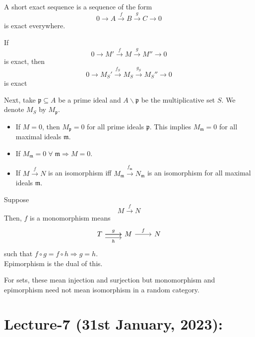 \documentclass[oneside, 12pt, ]{scrbook}
\newcommand{\pr}{\mathfrak{p}}
\newcommand{\m}{\mathfrak{m}}
\theoremstyle{theorem}
\begin{document}
\begin{definition}
A short exact sequence is a sequence of the form $$0 \rightarrow A \xrightarrow{f} B \xrightarrow{g} C \rightarrow 0$$ is exact everywhere.
\end{definition}

\begin{proposition}
If  $$0 \rightarrow M' \xrightarrow{f} M \xrightarrow{g} M'' \rightarrow 0$$ is exact, then $$0 \rightarrow M_{S}' \xrightarrow{f_{S}} M_{S} \xrightarrow{g_{S}} M_{S}'' \rightarrow 0$$ is exact
\end{proposition}

Next, take $\pr \subseteq A$ be a prime ideal and $A\backslash \pr$ be the multiplicative set $S$. We denote $M_{S}$ by $M_{\pr}$.
\begin{itemize}
\item If $M=0$, then $M_{\pr} =0$ for all prime ideals $\pr$. This implies $M_{\m} =0$ for all maximal ideals $\m$.
\item If $M_{\m} =0 \; \forall \; \m \Rightarrow M=0$.
\item If $M \xrightarrow{f} N$ is an isomorphism iff $M_{\m} \xrightarrow{f_{\m}} N_{\m}$ is an isomorphism for all maximal ideals $\m$.
\end{itemize}

\begin{definition}
Suppose $$M \xrightarrow{f} N$$ Then, $f$ is a monomorphism means 
\[\begin{tikzcd}
	T & M & N
	\arrow["f", from=1-2, to=1-3]
	\arrow["g", from=1-1, to=1-2]
	\arrow[from=1-1, to=1-2]
	\arrow["h"', shift right=2, from=1-1, to=1-2]
\end{tikzcd}\] such that $f\circ g = f\circ h \Rightarrow g=h$. \\

Epimorphism is the dual of this.
\end{definition}

\begin{remark}
For sets, these mean injection and surjection but monomorphism and epimorphism need not mean isomorphism in a random category. 
\end{remark}

\chapter{Lecture-7 (31st January, 2023): }
\end{document}
